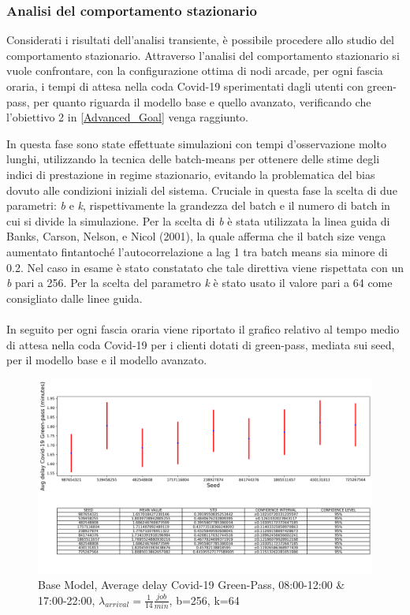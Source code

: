 \documentclass{article}
\begin{document}
\subsubsection{Analisi del comportamento stazionario}
Considerati i risultati dell'analisi transiente, è possibile procedere allo studio del comportamento stazionario.
Attraverso l'analisi del comportamento stazionario si vuole confrontare, con la configurazione ottima di nodi arcade, per ogni fascia oraria, i tempi di attesa nella coda Covid-19 sperimentati dagli utenti con green-pass, per quanto riguarda il modello base e quello avanzato, verificando che l'obiettivo 2 in \ref{Advanced_Goal} venga raggiunto.

In questa fase sono state effettuate simulazioni con tempi
d’osservazione molto lunghi, utilizzando la tecnica delle batch-means per ottenere delle stime degli indici di prestazione in regime stazionario, evitando la problematica del bias dovuto alle condizioni iniziali del sistema. Cruciale in questa fase la scelta di due parametri: \textit{b} e \textit{k}, rispettivamente la grandezza del batch e il numero di batch in cui si divide la simulazione. Per la scelta di \textit{b} è stata utilizzata la linea guida di Banks, Carson, Nelson, e Nicol (2001), la quale afferma che il batch size venga aumentato fintantoché l'autocorrelazione a lag 1 tra batch means sia minore di 0.2. Nel caso in esame è stato constatato che tale direttiva viene rispettata con un \textit{b} pari a 256.
Per la scelta del parametro \textit{k} è stato usato il valore pari a 64 come consigliato dalle linee guida.
\\ \\
In seguito per ogni fascia oraria viene riportato il grafico relativo al tempo medio di attesa nella coda Covid-19 per i clienti dotati di green-pass, mediata sui seed, per il modello base e il modello avanzato.

\begin{figure}[H]
	\centering
	\captionsetup{justification=centering,margin=2cm}
	\includegraphics[scale=0.48]{images/avg_d_covid_steady_state_mor.png}
	\caption{Base Model, Average delay Covid-19 Green-Pass, 08:00-12:00 \& 17:00-22:00, $\lambda_{arrival}=\frac{1}{14} \frac{job}{min}$, b=256, k=64}\label{figura:avg_d_covid_steady_state_mor}
\end{figure}
\end{document}
